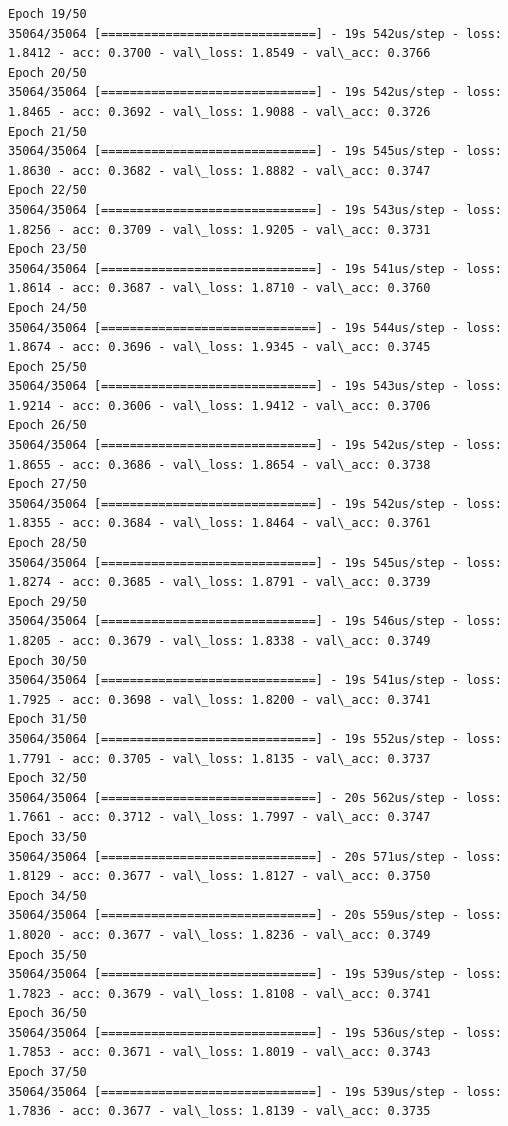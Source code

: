 \documentclass[11pt]{article}
\begin{document}
\begin{Verbatim}[commandchars=\\\{\}]
Epoch 19/50
35064/35064 [==============================] - 19s 542us/step - loss: 1.8412 - acc: 0.3700 - val\_loss: 1.8549 - val\_acc: 0.3766
Epoch 20/50
35064/35064 [==============================] - 19s 542us/step - loss: 1.8465 - acc: 0.3692 - val\_loss: 1.9088 - val\_acc: 0.3726
Epoch 21/50
35064/35064 [==============================] - 19s 545us/step - loss: 1.8630 - acc: 0.3682 - val\_loss: 1.8882 - val\_acc: 0.3747
Epoch 22/50
35064/35064 [==============================] - 19s 543us/step - loss: 1.8256 - acc: 0.3709 - val\_loss: 1.9205 - val\_acc: 0.3731
Epoch 23/50
35064/35064 [==============================] - 19s 541us/step - loss: 1.8614 - acc: 0.3687 - val\_loss: 1.8710 - val\_acc: 0.3760
Epoch 24/50
35064/35064 [==============================] - 19s 544us/step - loss: 1.8674 - acc: 0.3696 - val\_loss: 1.9345 - val\_acc: 0.3745
Epoch 25/50
35064/35064 [==============================] - 19s 543us/step - loss: 1.9214 - acc: 0.3606 - val\_loss: 1.9412 - val\_acc: 0.3706
Epoch 26/50
35064/35064 [==============================] - 19s 542us/step - loss: 1.8655 - acc: 0.3686 - val\_loss: 1.8654 - val\_acc: 0.3738
Epoch 27/50
35064/35064 [==============================] - 19s 542us/step - loss: 1.8355 - acc: 0.3684 - val\_loss: 1.8464 - val\_acc: 0.3761
Epoch 28/50
35064/35064 [==============================] - 19s 545us/step - loss: 1.8274 - acc: 0.3685 - val\_loss: 1.8791 - val\_acc: 0.3739
Epoch 29/50
35064/35064 [==============================] - 19s 546us/step - loss: 1.8205 - acc: 0.3679 - val\_loss: 1.8338 - val\_acc: 0.3749
Epoch 30/50
35064/35064 [==============================] - 19s 541us/step - loss: 1.7925 - acc: 0.3698 - val\_loss: 1.8200 - val\_acc: 0.3741
Epoch 31/50
35064/35064 [==============================] - 19s 552us/step - loss: 1.7791 - acc: 0.3705 - val\_loss: 1.8135 - val\_acc: 0.3737
Epoch 32/50
35064/35064 [==============================] - 20s 562us/step - loss: 1.7661 - acc: 0.3712 - val\_loss: 1.7997 - val\_acc: 0.3747
Epoch 33/50
35064/35064 [==============================] - 20s 571us/step - loss: 1.8129 - acc: 0.3677 - val\_loss: 1.8127 - val\_acc: 0.3750
Epoch 34/50
35064/35064 [==============================] - 20s 559us/step - loss: 1.8020 - acc: 0.3677 - val\_loss: 1.8236 - val\_acc: 0.3749
Epoch 35/50
35064/35064 [==============================] - 19s 539us/step - loss: 1.7823 - acc: 0.3679 - val\_loss: 1.8108 - val\_acc: 0.3741
Epoch 36/50
35064/35064 [==============================] - 19s 536us/step - loss: 1.7853 - acc: 0.3671 - val\_loss: 1.8019 - val\_acc: 0.3743
Epoch 37/50
35064/35064 [==============================] - 19s 539us/step - loss: 1.7836 - acc: 0.3677 - val\_loss: 1.8139 - val\_acc: 0.3735

\end{Verbatim}
\end{document}
